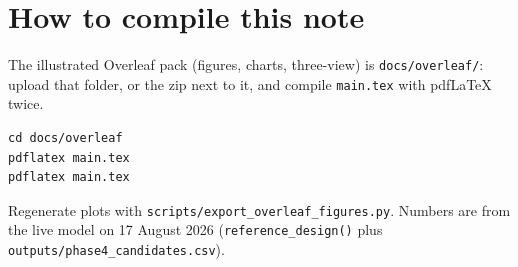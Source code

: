 \documentclass[11pt,letterpaper]{article}
\newcommand{\code}[1]{\texttt{#1}}
\begin{document}
\section{How to compile this note}

The illustrated Overleaf pack (figures, charts, three-view) is \code{docs/overleaf/}: upload that folder, or the zip next to it, and compile \code{main.tex} with pdfLaTeX twice.

\begin{verbatim}
cd docs/overleaf
pdflatex main.tex
pdflatex main.tex
\end{verbatim}

Regenerate plots with \code{scripts/export\_overleaf\_figures.py}. Numbers are from the live model on 17 August 2026 (\code{reference\_design()} plus \code{outputs/phase4\_candidates.csv}).
\end{document}
